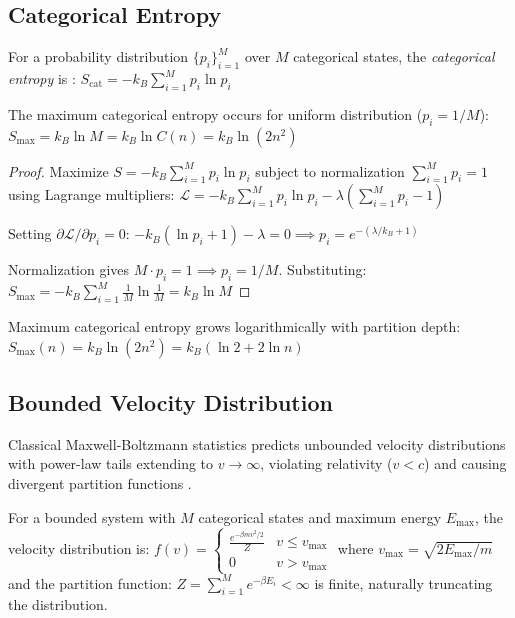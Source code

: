 \subsection{Categorical Entropy}

\begin{definition}
\label{def:catentropy}
For a probability distribution $\{p_i\}_{i=1}^{M}$ over $M$ categorical states, the \emph{categorical entropy} is \citep{shannon1948mathematical,boltzmann1877beziehung}:
$
S_{\mathrm{cat}} = -k_B \sum_{i=1}^{M} p_i \ln p_i
$
\end{definition}

\begin{proposition}
\label{prop:maxent}
The maximum categorical entropy occurs for uniform distribution ($p_i = 1/M$):
$
S_{\max} = k_B \ln M = k_B \ln C(n) = k_B \ln(2n^2)
$
\end{proposition}

\begin{proof}
Maximize $S = -k_B \sum_{i=1}^{M} p_i \ln p_i$ subject to normalization $\sum_{i=1}^{M} p_i = 1$ using Lagrange multipliers:
$
\mathcal{L} = -k_B \sum_{i=1}^{M} p_i \ln p_i - \lambda\left(\sum_{i=1}^{M} p_i - 1\right)
$

Setting $\partial \mathcal{L}/\partial p_i = 0$:
$
-k_B(\ln p_i + 1) - \lambda = 0 \implies p_i = e^{-(\lambda/k_B + 1)}
$

Normalization gives $M \cdot p_i = 1 \implies p_i = 1/M$. Substituting:
$
S_{\max} = -k_B \sum_{i=1}^{M} \frac{1}{M} \ln\frac{1}{M} = k_B \ln M
$
\end{proof}

\begin{corollary}
\label{cor:entropy_scaling}
Maximum categorical entropy grows logarithmically with partition depth:
$
S_{\max}(n) = k_B \ln(2n^2) = k_B(\ln 2 + 2\ln n)
$
\end{corollary}

\subsection{Bounded Velocity Distribution}

Classical Maxwell-Boltzmann statistics predicts unbounded velocity distributions with power-law tails extending to $v \to \infty$, violating relativity ($v < c$) and causing divergent partition functions \citep{maxwell1871theory,landau1980statistical}.

\begin{theorem}
\label{thm:maxwell}
For a bounded system with $M$ categorical states and maximum energy $E_{\max}$, the velocity distribution is:
$
f(v) = \begin{cases}
\frac{e^{-\beta m v^2/2}}{Z} & v \leq v_{\max} \\
0 & v > v_{\max}
\end{cases}
$
where $v_{\max} = \sqrt{2E_{\max}/m}$ and the partition function:
$
Z = \sum_{i=1}^{M} e^{-\beta E_i} < \infty
$
is finite, naturally truncating the distribution.
\end{theorem}

